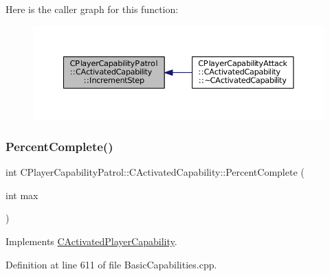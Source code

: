 Here is the caller graph for this function\+:
\nopagebreak
\begin{figure}[H]
\begin{center}
\leavevmode
\includegraphics[width=350pt]{classCPlayerCapabilityPatrol_1_1CActivatedCapability_a576a71646225c0723a0ed9e77add01fd_icgraph}
\end{center}
\end{figure}
\hypertarget{classCPlayerCapabilityPatrol_1_1CActivatedCapability_a868e6583a55b01e5aa3b926ef14677bc}{}\label{classCPlayerCapabilityPatrol_1_1CActivatedCapability_a868e6583a55b01e5aa3b926ef14677bc} 
\subsubsection{\texorpdfstring{Percent\+Complete()}{PercentComplete()}}
{\footnotesize\ttfamily int C\+Player\+Capability\+Patrol\+::\+C\+Activated\+Capability\+::\+Percent\+Complete (\begin{DoxyParamCaption}\item[{int}]{max }\end{DoxyParamCaption})\hspace{0.3cm}{\ttfamily [virtual]}}



Implements \hyperlink{classCActivatedPlayerCapability_a405dc6076058006a4f801727de4cfe4d}{C\+Activated\+Player\+Capability}.



Definition at line 611 of file Basic\+Capabilities.\+cpp.


